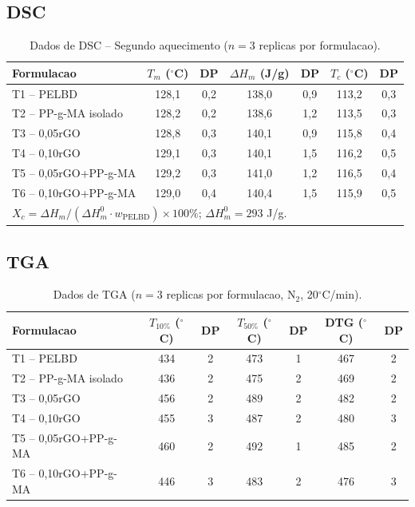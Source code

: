 \documentclass[11pt,a4paper]{article}
\begin{document}
\subsection{DSC}

\begin{table}[H]\centering
\caption{Dados de DSC -- Segundo aquecimento ($n=3$ replicas por formulacao).}\label{tab:dsc_bruto}
\begin{tabular}{lcccccc}
\toprule
{\bfseries Formulacao} & {\bfseries $T_m$ ($^{\circ}$C)} & {\bfseries DP} & {\bfseries $\Delta H_m$ (J/g)} & {\bfseries DP} & {\bfseries $T_c$ ($^{\circ}$C)} & {\bfseries DP} \\
\midrule
T1 -- PELBD           & 128,1 & 0,2 & 138,0 & 0,9 & 113,2 & 0,3 \\
T2 -- PP-g-MA isolado & 128,2 & 0,2 & 138,6 & 1,2 & 113,5 & 0,3 \\
T3 -- 0,05rGO         & 128,8 & 0,3 & 140,1 & 0,9 & 115,8 & 0,4 \\
T4 -- 0,10rGO         & 129,1 & 0,3 & 140,1 & 1,5 & 116,2 & 0,5 \\
T5 -- 0,05rGO+PP-g-MA & 129,2 & 0,3 & 141,0 & 1,2 & 116,5 & 0,4 \\
T6 -- 0,10rGO+PP-g-MA & 129,0 & 0,4 & 140,4 & 1,5 & 115,9 & 0,5 \\
\bottomrule
\multicolumn{7}{l}{$X_c = \Delta H_m / (\Delta H_m^0 \cdot w_{\text{PELBD}}) \times 100\%$; $\Delta H_m^0 = 293$ J/g.} \\
\end{tabular}
\end{table}

\subsection{TGA}

\begin{table}[H]\centering
\caption{Dados de TGA ($n=3$ replicas por formulacao, N$_2$, 20$^{\circ}$C/min).}\label{tab:tga_bruto}
\begin{tabular}{lcccccc}
\toprule
{\bfseries Formulacao} & {\bfseries $T_{10\%}$ ($^{\circ}$C)} & {\bfseries DP} & {\bfseries $T_{50\%}$ ($^{\circ}$C)} & {\bfseries DP} & {\bfseries DTG ($^{\circ}$C)} & {\bfseries DP} \\
\midrule
T1 -- PELBD           & 434 & 2 & 473 & 1 & 467 & 2 \\
T2 -- PP-g-MA isolado & 436 & 2 & 475 & 2 & 469 & 2 \\
T3 -- 0,05rGO         & 456 & 2 & 489 & 2 & 482 & 2 \\
T4 -- 0,10rGO         & 455 & 3 & 487 & 2 & 480 & 3 \\
T5 -- 0,05rGO+PP-g-MA & 460 & 2 & 492 & 1 & 485 & 2 \\
T6 -- 0,10rGO+PP-g-MA & 446 & 3 & 483 & 2 & 476 & 3 \\
\bottomrule
\end{tabular}
\end{table}
\end{document}
